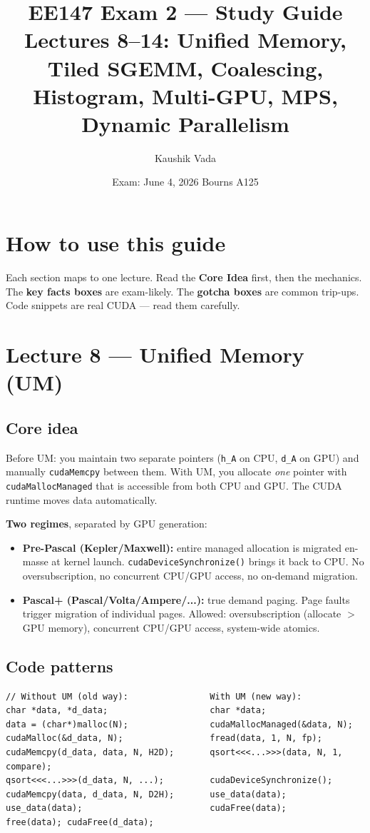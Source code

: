 \documentclass[10pt]{article}
\title{\vspace{-1.5em}\textbf{EE147 Exam 2 — Study Guide}\\
\large Lectures 8--14: Unified Memory, Tiled SGEMM, Coalescing, Histogram, Multi-GPU, MPS, Dynamic Parallelism}
\author{Kaushik Vada}
\date{Exam: June 4, 2026 \textbullet{} Bourns A125}
\begin{document}
\maketitle
\vspace{-2em}

\section*{How to use this guide}
Each section maps to one lecture. Read the \textbf{Core Idea} first, then the mechanics. The \textcolor{orange!80!black}{\textbf{key facts boxes}} are exam-likely. The \textcolor{red!70!black}{\textbf{gotcha boxes}} are common trip-ups. Code snippets are real CUDA — read them carefully.

\hrulefill

\section{Lecture 8 — Unified Memory (UM)}

\subsection*{Core idea}
Before UM: you maintain two separate pointers (\texttt{h\_A} on CPU, \texttt{d\_A} on GPU) and manually \texttt{cudaMemcpy} between them. With UM, you allocate \emph{one} pointer with \texttt{cudaMallocManaged} that is accessible from both CPU and GPU. The CUDA runtime moves data automatically.

\begin{keybox}
\textbf{Two regimes}, separated by GPU generation:
\begin{itemize}
  \item \textbf{Pre-Pascal (Kepler/Maxwell):} entire managed allocation is migrated en-masse at kernel launch. \texttt{cudaDeviceSynchronize()} brings it back to CPU. No oversubscription, no concurrent CPU/GPU access, no on-demand migration.
  \item \textbf{Pascal+ (Pascal/Volta/Ampere/...):} true demand paging. Page faults trigger migration of individual pages. Allowed: oversubscription (allocate $>$ GPU memory), concurrent CPU/GPU access, system-wide atomics.
\end{itemize}
\end{keybox}

\subsection*{Code patterns}
\begin{lstlisting}
// Without UM (old way):                With UM (new way):
char *data, *d_data;                    char *data;
data = (char*)malloc(N);                cudaMallocManaged(&data, N);
cudaMalloc(&d_data, N);                 fread(data, 1, N, fp);
cudaMemcpy(d_data, data, N, H2D);       qsort<<<...>>>(data, N, 1, compare);
qsort<<<...>>>(d_data, N, ...);         cudaDeviceSynchronize();
cudaMemcpy(data, d_data, N, D2H);       use_data(data);
use_data(data);                         cudaFree(data);
free(data); cudaFree(d_data);
\end{lstlisting}
\end{document}
